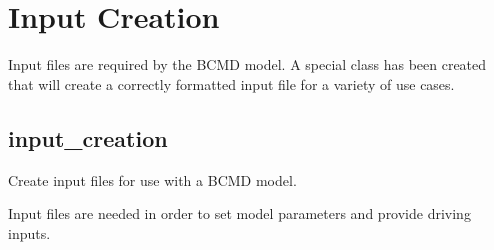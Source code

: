 \documentclass[letterpaper,10pt,english]{sphinxmanual}
\begin{document}
\section{Input Creation}
\label{\detokenize{bcmdModel:input-creation}}
Input files are required by the BCMD model. A special class has been created
that will create a correctly formatted input file for a variety of use cases.


\subsection{input\_creation}
\label{\detokenize{bcmdModel:module-bayescmd.bcmdModel.input_creation}}\label{\detokenize{bcmdModel:id1}}
Create input files for use with a BCMD model.

Input files are needed in order to set model parameters and provide driving
inputs.
\end{document}

